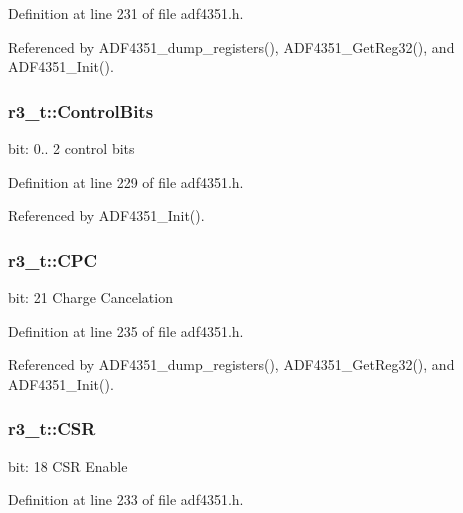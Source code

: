 Definition at line 231 of file adf4351.\+h.



Referenced by A\+D\+F4351\+\_\+dump\+\_\+registers(), A\+D\+F4351\+\_\+\+Get\+Reg32(), and A\+D\+F4351\+\_\+\+Init().

\subsubsection[{\texorpdfstring{Control\+Bits}{ControlBits}}]{ r3\+\_\+t\+::\+Control\+Bits}\hypertarget{structr3__t_a4d5d480a6e629c07e0bb5575fb0023bb}{}\label{structr3__t_a4d5d480a6e629c07e0bb5575fb0023bb}
bit\+: 0.. 2 control bits 

Definition at line 229 of file adf4351.\+h.



Referenced by A\+D\+F4351\+\_\+\+Init().

\subsubsection[{\texorpdfstring{C\+PC}{CPC}}]{ r3\+\_\+t\+::\+C\+PC}\hypertarget{structr3__t_a61a4e7b02af2c11e18e823eac349fabf}{}\label{structr3__t_a61a4e7b02af2c11e18e823eac349fabf}
bit\+: 21 Charge Cancelation 

Definition at line 235 of file adf4351.\+h.



Referenced by A\+D\+F4351\+\_\+dump\+\_\+registers(), A\+D\+F4351\+\_\+\+Get\+Reg32(), and A\+D\+F4351\+\_\+\+Init().

\subsubsection[{\texorpdfstring{C\+SR}{CSR}}]{ r3\+\_\+t\+::\+C\+SR}\hypertarget{structr3__t_a295a90a5720da8b88db8bf1420c806e2}{}\label{structr3__t_a295a90a5720da8b88db8bf1420c806e2}
bit\+: 18 C\+SR Enable 

Definition at line 233 of file adf4351.\+h.



